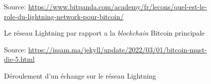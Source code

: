 \begin{figure}[h!]  
  
    \centering
    {\scriptsize Source: \url{https://www.bitpanda.com/academy/fr/lecons/quel-est-le-role-du-lightning-network-pour-bitcoin/}}
        \caption{Le réseau Lightning par rapport a la \textit{\gls{blockchain}} Bitcoin principale}
        \label{fig:lightningCouche}
    \end{figure}

\begin{figure}[h!]
    \centering
    {\scriptsize Source: \url{https://issam.ma/jekyll/update/2022/03/01/bitcoin-must-die-5.html}}
    \caption{Déroulement d'un échange sur le réseau Lightning}
    \label{fig:lightningNetwork}
\end{figure}

